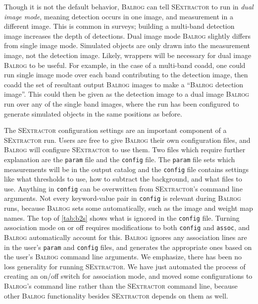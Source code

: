 \documentclass[11pt]{book}
\newcommand{\balrog}{\textsc{Balrog}}
\newcommand{\sex}{\textsc{SExtractor}}
\begin{document}
\hypertarget{hyper:dual}{}
Though it is not the default behavior, \balrog{} can tell \sex{} to run in \textit{dual image mode},
meaning detection occurs in one image, and measurement in a different image.
This is common in surveys; building a multi-band detection image increases the depth of detections. 
Dual image mode \balrog{} slightly differs from single image mode.
Simulated objects are only drawn into the measurement image, not the detection image.
Likely, wrappers will be necessary for dual image \balrog{} to be useful.
For example, in the case of a multi-band coadd, one could run single image mode over each band contributing to the detection image, 
then coadd the set of resultant output \balrog{} images to make a ``\balrog{} detection image''.
This could then be given as the detection image to a dual image \balrog{} run over any of the single band images,
where the run has been configured to generate simulated objects in the same positions as before.

The \sex{} configuration settings are an important component of a \sex{} run.
Users are free to give \balrog{} their own configuration files, and \balrog{} will configure \sex{} to use them.
Two files which require further explanation are the \texttt{param} file and the \texttt{config} file.
The \texttt{param} file sets which measurements will be in the output catalog and the \texttt{config} file
contains settings like what thresholds to use, how to subtract the background, and what files to use.
Anything in \texttt{config} can be overwritten from \sex{}'s command line arguments.
Not every keyword-value pair in \texttt{config} is relevant during \balrog{} runs,
because \balrog{} sets some automatically, such as the image and weight map names.
The top of \autoref{tab:b2s} shows what is ignored in the \texttt{config} file.
Turning association mode on or off requires modifications to both \texttt{config} and \texttt{assoc},
and \balrog{} automatically account for this.
\balrog{} ignores any association lines are in the user's \texttt{param} and \texttt{config} files,
and generates the appropriate ones based on the user's \balrog{} command line arguments.
We emphasize, there has been no loss generality for running \sex{}.
We have just automated the process of creating an on/off switch for association mode, and moved some
configurations to \balrog{}'s command line rather than the \sex{} command line,
because other \balrog{} functionality besides \sex{} depends on them as well.
\end{document}
